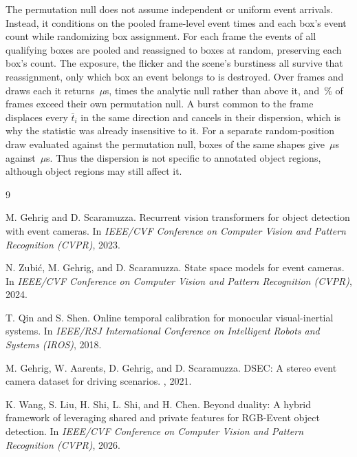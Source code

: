 \documentclass[10pt,twocolumn,letterpaper]{article}
\newcommand{\micro}{\ensuremath{\mu}}
\begin{document}
The permutation null does not assume independent or uniform event arrivals. Instead,
it conditions on the pooled frame-level event times and each box's event count while
randomizing box assignment. For each frame the events of all qualifying boxes are pooled
and reassigned to boxes at random, preserving each box's count. The exposure, the flicker and the scene's burstiness
all survive that reassignment, only which box an event belongs to is destroyed.
Over \permFrames{} frames and \permDraws{} draws each it returns
\permNull\,\micro s, \permRatio{} times the analytic null rather than above it,
and \permAbovePct\,\% of frames exceed their own permutation null. A burst common to the frame
displaces every $\bar{t}_{i}$ in the same direction and cancels in their
dispersion, which is why the statistic was already insensitive to it. For a separate
random-position draw evaluated against the permutation null, boxes of the same shapes give
\permRandObs\,\micro s against \permRandNull\,\micro s. Thus the dispersion is not specific
to annotated object regions, although object regions may still affect it.

\begin{thebibliography}{9}
\footnotesize

M. Gehrig and D. Scaramuzza.
\newblock Recurrent vision transformers for object detection with event cameras.
\newblock In {\em IEEE/CVF Conference on Computer Vision and Pattern Recognition
(CVPR)}, 2023.

N. Zubi\'c, M. Gehrig, and D. Scaramuzza.
\newblock State space models for event cameras.
\newblock In {\em IEEE/CVF Conference on Computer Vision and Pattern Recognition
(CVPR)}, 2024.

T. Qin and S. Shen.
\newblock Online temporal calibration for monocular visual-inertial systems.
\newblock In {\em IEEE/RSJ International Conference on Intelligent Robots and
Systems (IROS)}, 2018.

M. Gehrig, W. Aarents, D. Gehrig, and D. Scaramuzza.
\newblock DSEC: A stereo event camera dataset for driving scenarios.
, 2021.

K. Wang, S. Liu, H. Shi, L. Shi, and H. Chen.
\newblock Beyond duality: A hybrid framework of leveraging shared and private
features for RGB-Event object detection.
\newblock In {\em IEEE/CVF Conference on Computer Vision and Pattern Recognition
(CVPR)}, 2026.

\end{thebibliography}
\end{document}
